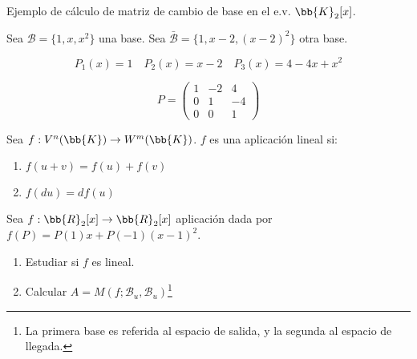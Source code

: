 \begin{ejemplo} Ejemplo de cálculo de matriz de cambio de base en el e.v. $\bb{K}_2[x]$.

    Sea $\mathcal{B} = \{1, x, x^2\}$ una base. Sea $\bar{\mathcal{B}} = \{1, x-2, (x-2)^2\}$ otra base.
    
    \begin{equation*}
        P_1(x) = 1 \quad P_2(x) = x-2 \quad P_3(x) = 4-4x+x^2  
    \end{equation*}
    
    \begin{equation*}
        P = \left( \begin{array}{ccc}
         1 & -2 & 4 \\
         0 & 1  & -4 \\
         0 & 0  & 1
        \end{array} \right)
    \end{equation*} 

\end{ejemplo}

\begin{definicion}
    Sea $f:V^n(\bb{K}) \to W^m(\bb{K})$. $f$ es una aplicación lineal si:
    \begin{enumerate}
        \item $f(u+v) = f(u) + f(v)$
        \item $f(du) = df(u)$
    \end{enumerate}
\end{definicion}
\begin{ejercicio*}
    Sea $f:\bb{R}_2[x] \to \bb{R}_2[x]$ aplicación dada por $f(P) = P(1)x + P(-1)(x-1)^2$.
    \begin{enumerate}
        \item Estudiar si $f$ es lineal.
        \item Calcular $A=M(f; \mathcal{B}_u, \mathcal{B}_u)$\footnote{La primera base es referida al espacio de salida, y la segunda al espacio de llegada.}
    \end{enumerate}
\end{ejercicio*}

